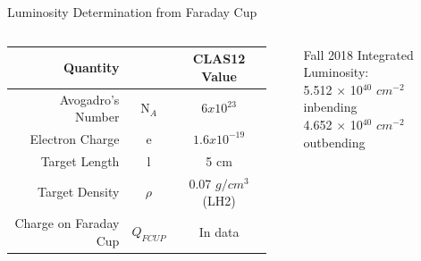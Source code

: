 \documentclass[aspectratio=169]{beamer}
\begin{document}
\begin{frame}{ Luminosity Determination from Faraday Cup}
\begin{columns}
                                
            \vspace{-0.5cm}
                \begin{table}
                    \centering
                    \begin{tabular}{rcc}
                        Quantity &  & CLAS12 Value \\\hline
                       Avogadro's Number &  N$_A$  & $6x10^{23}$ \\
                        Electron Charge &e  &  $1.6x10^{-19}$ \\
                        Target Length &l &  5 cm \\
                        Target Density &$\rho$  &  0.07 $g/cm^3$ (LH2) \\
                        Charge on Faraday Cup & $Q_{FCUP}$ &  In data\\
                    \end{tabular}
                    \label{tab:demo}
                \end{table}
                \vspace{0.5 cm}
                \begin{center}
                    Fall 2018 Integrated Luminosity:\\
                5.512 $\times$ 10$^{40}$ $cm^{-2}$ inbending\\
                4.652 $\times$ 10$^{40}$ $cm^{-2}$ outbending
               
                \end{center}
       

            
        \end{columns}

\end{frame}    
\end{document}
